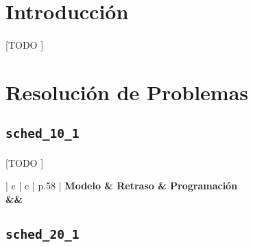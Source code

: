 \documentclass[spanish]{article}
\begin{document}
	\maketitle %

	\thispagestyle{fancy} %



	\begin{abstract}
		\noindent [TODO ]
	\end{abstract}


	\section{Introducción}
	\label{sec:intro}

		\paragraph{}
		[TODO ]

	\section{Resolución de Problemas}
	\label{sec:problems}

		\subsection{\texttt{sched\_10\_1}}

			\paragraph{}
			[TODO ]

			\begin{table}[h]
				\centering
				\begin{tabu}{ | c | c | p{.58\linewidth} |}
					\hline
					\bfseries Modelo & \bfseries Retraso & \bfseries Programación
					{\\\hline\model&\delay&\schedule}
					\\\hline
				\end{tabu}
				\caption{[TODO ]}
				\label{table:sol-sched_10_1}
			\end{table}

		\subsection{\texttt{sched\_20\_1}}
\end{document}
